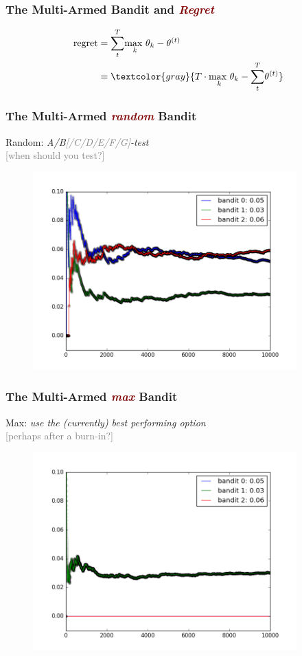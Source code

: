 \documentclass[xcolor={dvipsnames}]{beamer}
\begin{document}
\frame
{
\frametitle{The Multi-Armed Bandit and \textcolor{Maroon}{\emph{Regret}}}

\Huge
\begin{align*}
\text{regret} = {}& \overset{T} {\underset{t}{\sum}} \underset{k}{\text{max }} \theta_k - \theta^{(t)} \\
 = {}& \textcolor{gray}{T \cdot \underset{k}{\text{max }} \theta_k - \overset{T}{\underset{t}{\sum}} \theta^{(t)}}
\end{align*}
}




\frame
{
\frametitle{The Multi-Armed \textcolor{Maroon}{\emph{random}} Bandit}


Random: \emph{A/B\textcolor{gray}{[/C/D/E/F/G]}-test}\\\textcolor{gray}{[when should you test?]}


\begin{figure}
\centering
\noindent \includegraphics[height=3in]{stuff/mab_ran.png}
\end{figure}
}





\frame
{
\frametitle{The Multi-Armed  \textcolor{Maroon}{\emph{max}} Bandit}


Max: \emph{use the (currently) best performing option}\\\textcolor{gray}{[perhaps after a burn-in?]} 


\begin{figure}
\centering
\noindent \includegraphics[height=3in]{stuff/mab_max.png}
\end{figure}
}
\end{document}
